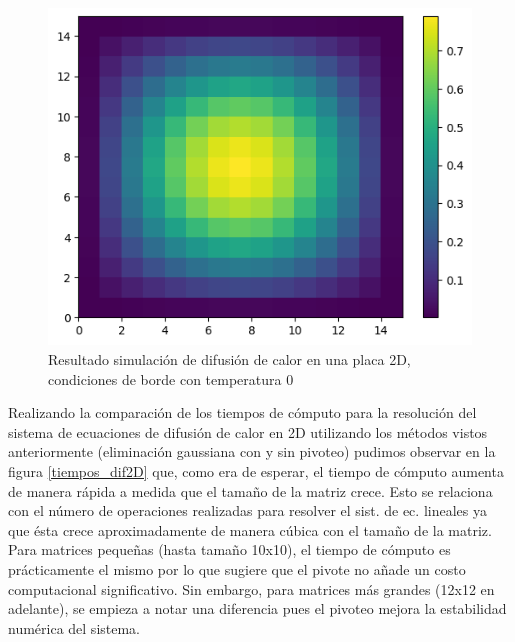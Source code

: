 \begin{figure}[H]
\centerline{\includegraphics[scale=0.45]{./img/2Dcasoborde0.png}}
\caption{Resultado simulación de difusión de calor en una placa 2D, condiciones de borde con temperatura 0}
\label{result_dif}
\end{figure}



Realizando la comparación de los tiempos de cómputo para la resolución del sistema de ecuaciones de difusión de calor en 2D utilizando los métodos vistos anteriormente (eliminación gaussiana con y sin pivoteo) pudimos observar en la figura \ref{tiempos_dif2D} que, como era de esperar, el tiempo de cómputo aumenta de manera rápida a medida que el tamaño de la matriz crece. Esto se relaciona con el número de operaciones realizadas para resolver el sist. de ec. lineales ya que ésta crece aproximadamente de manera cúbica con el tamaño de la matriz.
Para matrices pequeñas (hasta tamaño 10x10), el tiempo de cómputo es prácticamente el mismo por lo que sugiere que el pivote no añade un costo computacional significativo. Sin embargo, para matrices más grandes (12x12 en adelante), se empieza a notar una diferencia pues el pivoteo mejora la estabilidad numérica del sistema.

